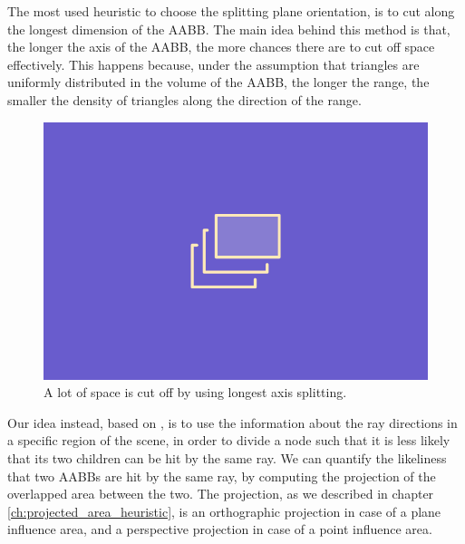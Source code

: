 \documentclass{PoliMi_MasterThesis}
\begin{document}
The most used heuristic to choose the splitting plane orientation, is to cut along the longest dimension of the AABB. The main idea behind this method is that, the longer the axis of the AABB, the more chances there are to cut off space effectively. This happens because, under the assumption that triangles are uniformly distributed in the volume of the AABB, the longer the range, the smaller the density of triangles along the direction of the range.

\begin{figure}[H]
    \centering
    \includegraphics[width=\textwidth*\real{0.6}]{Images/TODO.png}
    \caption{A lot of space is cut off by using longest axis splitting.}
    \label{fig:longest_axis_splitting}
\end{figure}

Our idea instead, based on \cite{bvh_overlapping_metric}, is to use the information about the ray directions in a specific region of the scene, in order to divide a node such that it is less likely that its two children can be hit by the same ray. We can quantify the likeliness that two AABBs are hit by the same ray, by computing the projection of the overlapped area between the two. The projection, as we described in chapter \ref{ch:projected_area_heuristic}, is an orthographic projection in case of a plane influence area, and a perspective projection in case of a point influence area.
\end{document}
